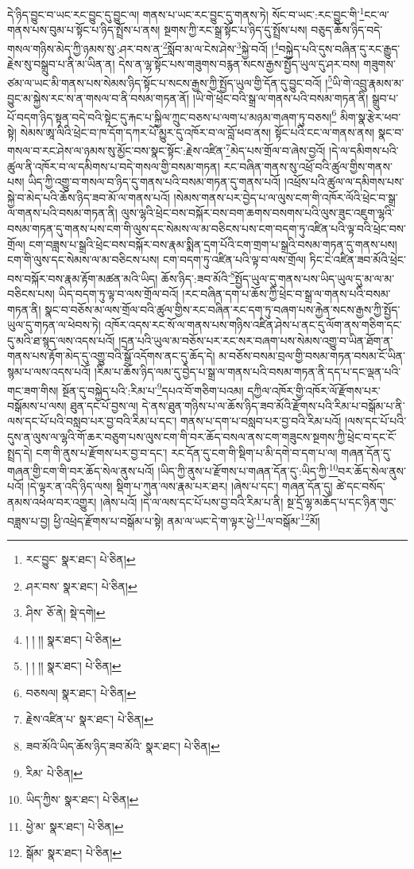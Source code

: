 དེ་ཉིད་བྱུང་བ་ཡང་རང་བྱུང་དུ་བྱུང་ལ། གནས་པ་ཡང་རང་བྱུང་དུ་གནས་ཏེ། སོང་བ་ཡང་:རང་བྱུང་གི་\footnote{རང་བྱུང་  སྣར་ཐང་།  པེ་ཅིན། }ངང་ལ་གནས་པས་བུམ་པ་སྟོང་པ་ཉིད་སྤྲོས་པ་ནས། སྔགས་ཀྱི་རང་སྒྲ་སྟོང་པ་ཉིད་དུ་སྤྲོས་པས། བཅུད་ཆོས་ཉིད་བདེ་གསལ་གཉིས་མེད་ཀྱི་ཉམས་སུ་:ཤར་བས་ན་\footnote{ཤར་བས་  སྣར་ཐང་།  པེ་ཅིན། }སློབ་མ་ལ་ངེས་ཤེས་\footnote{ཤིས་  ཅོ་ནེ།  སྡེ་དགེ། }སྐྱེ་བའོ། །\footnote{། ། །།  སྣར་ཐང་།  པེ་ཅིན། }བསྐྱེད་པའི་དུས་བཞིན་དུ་རང་རྒྱུད་རྗེས་སུ་བསྒྲུབ་པ་ནི་མ་ཡིན་ན། དེས་ན་ལྷ་སྟོང་པས་གཟུགས་བརྙན་སངས་རྒྱས་སྤྱོད་ཡུལ་དུ་ཤར་བས། གཟུགས་ཙམ་ལ་ཡང་མི་གནས་པས་སེམས་ཉིད་སྟོང་པ་སངས་རྒྱས་ཀྱི་སྤྱོད་ཡུལ་གྱི་དོན་དུ་བྱུང་བའོ། །\footnote{། ། །།  སྣར་ཐང་།  པེ་ཅིན། }ཡི་གེ་འབྲུ་རྣམས་མ་བྱུང་མ་སྐྱེས་རང་ས་ན་གསལ་བ་ནི་བསམ་གཏན་ནོ། །ཡི་གེ་ཕྲེང་བའི་སྒྲ་ལ་གནས་པའི་བསམ་གཏན་ནི། སྒྲུབ་པ་པོ་བདག་ཉིད་སྟན་བདེ་བའི་སྟེང་དུ་རྐང་པ་སྐྱིལ་ཀྲུང་བཅས་པ་ལག་པ་མཉམ་གཞག་ཏུ་བཅས།\footnote{བཅསལ།  སྣར་ཐང་།  པེ་ཅིན། } མིག་སྣ་རྩེར་ཕབ་སྟེ། སེམས་ཨཱ་ལིའི་ཕྲེང་བ་ཁ་དོག་དཀར་པོ་མྱུར་དུ་འཁོར་བ་ལ་བློ་ཕབ་ནས། སྟོང་པའི་ངང་ལ་གནས་ནས། སྣང་བ་གསལ་བ་རང་ཤེས་ལ་ཉམས་སུ་མྱོང་བས་སྣང་སྟོང་:རྗེས་འཛིན་\footnote{རྗེས་འཛིན་པ་  སྣར་ཐང་།  པེ་ཅིན། }མེད་པས་གྲོལ་བ་ཞེས་བྱའོ། །དེ་ལ་དམིགས་པའི་ཚུལ་ནི་འཁོར་བ་ལ་དམིགས་པ་བདེ་གསལ་གྱི་བསམ་གཏན། རང་བཞིན་གནས་སུ་འཕྲོ་བའི་ཚུལ་གྱིས་གནས་པས། ཡིད་ཀྱི་འགྱུ་བ་གསལ་བ་ཉིད་དུ་གནས་པའི་བསམ་གཏན་དུ་གནས་པའོ། །འཕྲོས་པའི་ཚུལ་ལ་དམིགས་པས་སྐྱེ་བ་མེད་པའི་ཆོས་ཉིད་ཟབ་མོ་ལ་གནས་པའོ། །སེམས་གནས་པར་བྱེད་པ་ལ་ལུས་ངག་གི་འཁོར་ལོའི་ཕྲེང་བ་སྒྲ་ལ་གནས་པའི་བསམ་གཏན་ནི། ལུས་ལྷའི་ཕྲེང་བས་བསྐོར་བས་བག་ཆགས་བསགས་པའི་ལུས་ཟུང་འཇུག་ལྷའི་བསམ་གཏན་དུ་གནས་པས་ངག་གི་ལུས་དང་སེམས་ལ་མ་བཅིངས་པས་ངག་བདག་ཏུ་འཛིན་པའི་ལྟ་བའི་ཕྲེང་བས་གྲོལ། ངག་བཟླས་པ་སྒྲའི་ཕྲེང་བས་བསྐོར་བས་རྣམ་སྨིན་དྲག་པོའི་ངག་གྲག་པ་སྒྲའི་བསམ་གཏན་དུ་གནས་པས། ངག་གི་ལུས་དང་སེམས་ལ་མ་བཅིངས་པས། ངག་བདག་ཏུ་འཛིན་པའི་ལྟ་བ་ལས་གྲོལ། ཏིང་ངེ་འཛིན་ཟབ་མོའི་ཕྲེང་བས་བསྐོར་བས་རྣམ་རྟོག་མཚན་མའི་ཡིད། ཆོས་ཉིད་:ཟབ་མོའི་\footnote{ཟབ་མོའི་ཡིད་ཆོས་ཉིད་ཟབ་མོའི་  སྣར་ཐང་།  པེ་ཅིན། }སྤྱོད་ཡུལ་དུ་གནས་པས་ཡིད་ཡུལ་དུ་མ་ལ་མ་བཅིངས་པས། ཡིད་བདག་ཏུ་ལྟ་བ་ལས་གྲོལ་བའོ། །རང་བཞིན་དག་པ་ཆོས་ཀྱི་ཕྲེང་བ་སྒྲ་ལ་གནས་པའི་བསམ་གཏན་ནི། སྣང་བ་བཅོས་མ་ལས་གྲོལ་བའི་ཚུལ་གྱིས་རང་བཞིན་རང་དག་ཏུ་བཞག་པས་རྐྱེན་སངས་རྒྱས་ཀྱི་སྤྱོད་ཡུལ་དུ་གཏན་ལ་ཕེབས་ཏེ། འཁོར་འདས་རང་སོ་ལ་གནས་པས་གཉིས་འཛིན་ཤེས་པ་ནང་དུ་ལོག་ནས་གཅིག་དང་དུ་མའི་ཐ་སྙད་ལས་འདས་པའོ། །དྲན་པའི་ཡུལ་མ་བཅོས་པར་རང་སར་བཞག་པས་སེམས་འགྱུ་བ་ཡིན་ཐོག་ན་གནས་པས་རྟོག་མེད་དུ་འགྱུ་བའི་སྒྲོ་འདོགས་ནང་དུ་ཆོད་དེ། མ་བཅོས་བསམ་བྲལ་གྱི་བསམ་གཏན་བསམ་ངོ་ཡིན་སྙམ་པ་ལས་འདས་པའོ། །རིམ་པ་ཆོས་ཉིད་ལམ་དུ་བྱེད་པ་སྒྲ་ལ་གནས་པའི་བསམ་གཏན་ནི་དད་པ་དང་ལྡན་པའི་གང་ཟག་གིས། སྔོན་དུ་བསྐྱེད་པའི་:རིམ་པ་\footnote{རིམ་  པེ་ཅིན། }དཔའ་བོ་གཅིག་པའམ། དཀྱིལ་འཁོར་གྱི་འཁོར་ལོ་རྫོགས་པར་བསྒོམས་པ་ལས། ཐུན་དང་པོ་བྱས་ལ། དེ་ནས་ཐུན་གཉིས་པ་ལ་ཆོས་ཉིད་ཟབ་མོའི་རྫོགས་པའི་རིམ་པ་བསྒོམ་པ་ནི་ལས་དང་པོ་པའི་བསླབ་པར་བྱ་བའི་རིམ་པ་དང་། གནས་པ་དག་པ་བསླབ་པར་བྱ་བའི་རིམ་པའོ། །ལས་དང་པོ་པའི་དུས་ན་ལུས་ལ་ལྷའི་གོ་ཆར་བཅུག་པས་ལུས་ངག་གི་བར་ཆོད་བསལ་ནས་ངག་གཟུངས་སྔགས་ཀྱི་ཕྲེང་བ་དང་ངོ་སྤྲད་དེ། ངག་གི་ནུས་པ་རྫོགས་པར་བྱ་བ་དང་། རང་དོན་དུ་ངག་གི་སྡིག་པ་མི་དགེ་བ་དག་པ་ལ། གཞན་དོན་དུ་གཞན་གྱི་ངག་གི་བར་ཆོད་སེལ་ནུས་པའོ། །ཡིད་ཀྱི་ནུས་པ་རྫོགས་པ་གཞན་དོན་དུ་:ཡིད་ཀྱི་\footnote{ཡིད་ཀྱིས་  སྣར་ཐང་།  པེ་ཅིན། }བར་ཆོད་སེལ་ནུས་པའོ། །དེ་ལྟར་ན་འདི་ཉིད་ལས། སྡིག་པ་ཀུན་ལས་རྣམ་པར་ཐར། །ཞེས་པ་དང་། གཞན་དོན་དུ། ཚེ་དང་བསོད་ནམས་འཕེལ་བར་འགྱུར། །ཞེས་པའོ། །དེ་ལ་ལས་དང་པོ་པས་བྱ་བའི་རིམ་པ་ནི། སྔ་དྲོ་ལྷ་མཆོད་པ་དང་ཉིན་གུང་བཟླས་པ་བྱ། ཕྱི་འཕྲེད་རྫོགས་པ་བསྒོམ་པ་སྟེ། ནམ་ལ་ཡང་དེ་ག་ལྟར་ཕྱེ་\footnote{ཕྱེ་མ་  སྣར་ཐང་།  པེ་ཅིན། }ལ་བསྒོམ་\footnote{སྒོམ་  སྣར་ཐང་།  པེ་ཅིན། }མོ། 